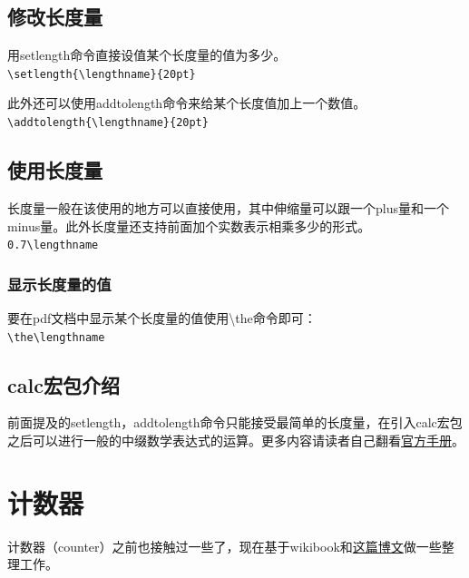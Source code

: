 \documentclass[11pt,oneside]{book}
\begin{document}
\section{修改长度量}
用setlength命令直接设值某个长度量的值为多少。\\
\verb+\setlength{\lengthname}{20pt}+

此外还可以使用addtolength命令来给某个长度值加上一个数值。\\
\verb+\addtolength{\lengthname}{20pt}+

\section{使用长度量}
长度量一般在该使用的地方可以直接使用，其中伸缩量可以跟一个plus量和一个minus量。此外长度量还支持前面加个实数表示相乘多少的形式。\\
\verb+0.7\lengthname+

\subsection{显示长度量的值}
要在pdf文档中显示某个长度量的值使用\textbackslash the命令即可：\\
\verb+\the\lengthname+

\section{calc宏包介绍}
前面提及的setlength，addtolength命令只能接受最简单的长度量，在引入calc宏包之后可以进行一般的中缀数学表达式的运算。更多内容请读者自己翻看\href{http://mirrors.ctan.org/macros/latex/required/tools/calc.pdf}{官方手册}。




\chapter{计数器}
计数器（counter）之前也接触过一些了，现在基于wikibook和\href{http://texblog.org/2007/07/25/counters-in-latex/}{这篇博文}做一些整理工作。
\end{document}
